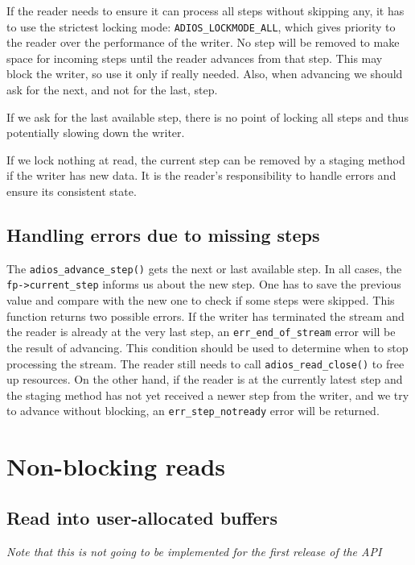 If the reader needs to ensure it can process all steps without skipping any, it has to use the strictest locking mode: \verb+ADIOS_LOCKMODE_ALL+, which gives priority to the reader over the performance of the writer. No step will be removed to make space for incoming steps until the reader advances from that step. This may block the writer, so use it only if really needed. Also, when advancing we should ask for the next, and not for the last, step. 

If we ask for the last available step, there is no point of locking all steps and thus potentially slowing down the writer. 

If we lock nothing at read, the current step can be removed by a staging method if the writer has new data. It is the reader's responsibility to handle errors and ensure its consistent state. 

\subsection{Handling errors due to missing steps}
The \verb+adios_advance_step()+ gets the next or last available step. In all cases, the \verb+fp->current_step+ informs us about the new step. One has to save the previous value and compare with the new one to check if some steps were skipped. This function returns two possible errors. If the writer has terminated the stream and the reader is already at the very last step, an \verb+err_end_of_stream+ error will be the result of advancing. This condition should be used to determine when to stop processing the stream. The reader still needs to call \verb+adios_read_close()+ to free up resources. On the other hand, if the reader is at the currently latest step and the staging method has not yet received a newer step from the writer, and we try to advance without blocking, an \verb+err_step_notready+ error will be returned.  




\section{Non-blocking reads}

\subsection{Read into user-allocated buffers}
\emph{Note that this is not going to be implemented for the first release of the API}

